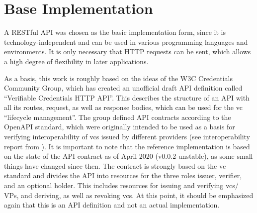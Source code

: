     \section{Base Implementation}\label{section: base-implementation}
    A RESTful API was chosen as the basic implementation form, since it is technology-independent and can be used in various programming languages and environments. It is only necessary that HTTP requests can be sent, which allows a high degree of flexibility in later applications. 
    
    As a basis, this work is roughly based on the ideas of the W3C Credentials Community Group, which has created an unofficial draft API definition called “Verifiable Credentials HTTP API”. This describes the structure of an API with all its routes, request, as well as response bodies, which can be used for the \ac{vc} “lifecycle management”. The group defined API contracts according to the OpenAPI standard, which were originally intended to be used as a basis for verifying interoperability of \acp{vc} issued by different providers (see interoperability report from \cite{homeland_security_preventing_2020}). It is important to note that the reference implementation is based on the state of the API contract as of April 2020 (v0.0.2-unstable), as some small things have changed since then. The contract is strongly based on the \ac{vc} standard and divides the API into resources for the three roles issuer, verifier, and an optional holder. This includes resources for issuing and verifying \acp{vc}/ \acp{VP}, and deriving, as well as revoking \acp{vc}. At this point, it should be emphasized again that this is an API definition and not an actual implementation. \cite{world_wide_web_consortium_credentials_community_group_vc_2021, world_wide_web_consortium_credentials_community_group_verifiable_2021}
    
